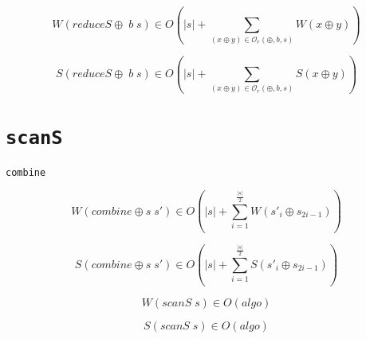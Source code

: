 \documentclass[a4paper,10pt]{article}
\begin{document}
\begin{equation*}
    W \left( reduceS \oplus \; b \; s \right) \in
    O \left( \vert s \vert + \sum_{(x \oplus y) \in \mathcal{O}_r(\oplus,b,s)} W \left( x \oplus y \right) \right)
\end{equation*}

\begin{equation*}
    S \left( reduceS \oplus \; b \; s \right) \in
    O \left( \vert s \vert + \sum_{(x \oplus y) \in \mathcal{O}_r(\oplus,b,s)} S \left( x \oplus y \right) \right)
\end{equation*}

\section*{\texttt{scanS}}

\texttt{combine}

\begin{equation*}
    W \left( combine \oplus s \; s' \right) \in
    O \left( \vert s \vert + \sum_{i=1}^{\frac{\vert s \vert}{2}} W \left( s'_{i} \oplus s_{2i - 1} \right) \right)
\end{equation*}

\begin{equation*}
    S \left( combine \oplus s \; s' \right) \in
    O \left( \vert s \vert + \sum_{i=1}^{\frac{\vert s \vert}{2}} S \left( s'_{i} \oplus s_{2i - 1} \right) \right)
\end{equation*}

\begin{equation*}
    W \left( scanS \; s \right) \in
    O \left( algo \right)
\end{equation*}

\begin{equation*}
    S \left( scanS \; s \right) \in O \left( algo \right)
\end{equation*}

\newpage{}
\end{document}

